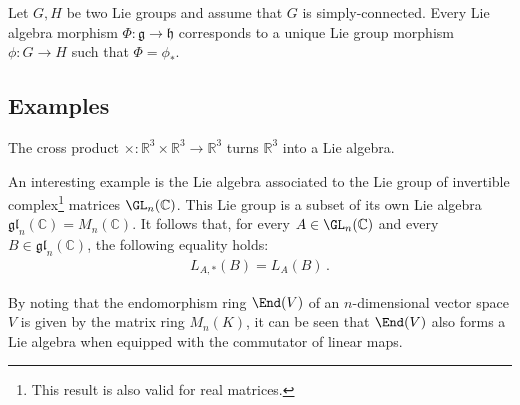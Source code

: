     \begin{property}\label{lie:prop_hom}
        Let $G,H$ be two Lie groups and assume that $G$ is simply-connected. Every Lie algebra morphism $\Phi:\mathfrak{g}\rightarrow\mathfrak{h}$ corresponds to a unique Lie group morphism $\phi:G\rightarrow H$ such that $\Phi=\phi_*$.
    \end{property}

\subsection{Examples}

    \begin{example}
        The cross product $\times:\mathbb{R}^3\times\mathbb{R}^3\rightarrow\mathbb{R}^3$ turns $\mathbb{R}^3$ into a Lie algebra.
    \end{example}
    \begin{example}
        An interesting example is the Lie algebra associated to the Lie group of invertible complex\footnote{This result is also valid for real matrices.} matrices $\GL_n(\mathbb{C})$. This Lie group is a subset of its own Lie algebra $\mathfrak{gl}_n(\mathbb{C}) = M_n(\mathbb{C})$. It follows that, for every $A\in\GL_n(\mathbb{C})$ and every $B\in\mathfrak{gl}_n(\mathbb{C})$, the following equality holds:
        \begin{gather}
            L_{A,*}(B)=L_A(B)\,.
        \end{gather}
    \end{example}
    \begin{result}\label{lie:end_as_lie_algebra}
        By noting that the endomorphism ring $\End(V)$ of an $n$-dimensional vector space $V$ is given by the matrix ring $M_n(K)$, it can be seen that $\End(V)$ also forms a Lie algebra when equipped with the commutator of linear maps.
    \end{result}


